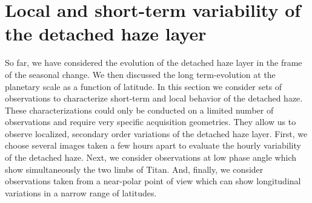 \section{Local and short-term variability of the detached haze layer}
\label{seq:local_variations}

So far, we have considered the evolution of the detached haze layer in the frame of the seasonal change.
We then discussed the long term-evolution at the planetary scale as a function of latitude.
In this section we consider sets of observations to characterize short-term and local behavior of the detached haze.
These characterizations could only be conducted on a limited number of observations and require very specific acquisition geometries. They allow us to observe localized, secondary order variations of the detached haze layer.
First, we choose several images taken a few hours apart to
evaluate the hourly variability of the detached haze. Next, we consider
observations at low phase angle which show simultaneously the two limbs of Titan. And, finally,
we consider observations taken from a near-polar point of view which can show
longitudinal variations in a narrow range of latitudes.




